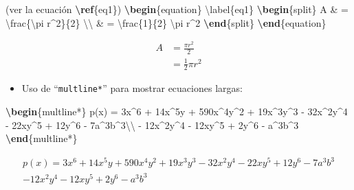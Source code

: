 \documentclass[12pt,a4paper,oneside,]{book}
\newenvironment{Shaded}{\begin{snugshade}}{\end{snugshade}}
\newcommand{\ExtensionTok}[1]{#1}
\newcommand{\KeywordTok}[1]{\textcolor[rgb]{0.13,0.29,0.53}{\textbf{#1}}}
\newcommand{\NormalTok}[1]{#1}
\newcommand{\SpecialCharTok}[1]{\textcolor[rgb]{0.00,0.00,0.00}{#1}}
\newcommand{\SpecialStringTok}[1]{\textcolor[rgb]{0.31,0.60,0.02}{#1}}
\providecommand{\tightlist}{%
  \setlength{\itemsep}{0pt}\setlength{\parskip}{0pt}}
\numberwithin{dummy}{section}
\theoremstyle{ocrenumbox}
\theoremstyle{blacknumex}
\theoremstyle{blacknumbox}
\theoremstyle{ocrenum}
\theoremstyle{ocrenum}
\begin{document}
\begin{Shaded}
\begin{Highlighting}[]
\NormalTok{(ver la ecuación }\KeywordTok{\textbackslash{}ref}\NormalTok{\{}\ExtensionTok{eq1}\NormalTok{\})}
\KeywordTok{\textbackslash{}begin}\NormalTok{\{}\ExtensionTok{equation}\NormalTok{\}}\SpecialStringTok{ }\SpecialCharTok{\textbackslash{}label}\SpecialStringTok{\{eq1\}}
\KeywordTok{\textbackslash{}begin}\NormalTok{\{}\ExtensionTok{split}\NormalTok{\}}
\SpecialStringTok{A \& = }\SpecialCharTok{\textbackslash{}frac}\SpecialStringTok{\{}\SpecialCharTok{\textbackslash{}pi}\SpecialStringTok{ r\^{}2\}\{2\} }\SpecialCharTok{\textbackslash{}\textbackslash{}}
\SpecialStringTok{ \& = }\SpecialCharTok{\textbackslash{}frac}\SpecialStringTok{\{1\}\{2\} }\SpecialCharTok{\textbackslash{}pi}\SpecialStringTok{ r\^{}2}
\KeywordTok{\textbackslash{}end}\NormalTok{\{}\ExtensionTok{split}\NormalTok{\}}
\KeywordTok{\textbackslash{}end}\NormalTok{\{}\ExtensionTok{equation}\NormalTok{\}}
\end{Highlighting}
\end{Shaded}

\begin{equation} \label{eq1}
\begin{split}
A & = \frac{\pi r^2}{2} \\
 & = \frac{1}{2} \pi r^2
\end{split}
\end{equation}

\begin{itemize}
\tightlist
\item
  Uso de ``\texttt{multline*}'' para mostrar ecuaciones largas:
\end{itemize}

\begin{Shaded}
\begin{Highlighting}[]
\KeywordTok{\textbackslash{}begin}\NormalTok{\{}\ExtensionTok{multline*}\NormalTok{\}}
\SpecialStringTok{p(x) = 3x\^{}6 + 14x\^{}5y + 590x\^{}4y\^{}2 + 19x\^{}3y\^{}3 }
\SpecialStringTok{            {-} 32x\^{}2y\^{}4 {-} 22xy\^{}5 + 12y\^{}6 {-} 7a\^{}3b\^{}3}\SpecialCharTok{\textbackslash{}\textbackslash{}}\SpecialStringTok{ }
\SpecialStringTok{{-} 12x\^{}2y\^{}4 {-} 12xy\^{}5 + 2y\^{}6 {-} a\^{}3b\^{}3}
\KeywordTok{\textbackslash{}end}\NormalTok{\{}\ExtensionTok{multline*}\NormalTok{\}}
\end{Highlighting}
\end{Shaded}

\begin{multline*}
p(x) = 3x^6 + 14x^5y + 590x^4y^2 + 19x^3y^3 
            - 32x^2y^4 - 22xy^5 + 12y^6 - 7a^3b^3 \\ 
- 12x^2y^4 - 12xy^5 + 2y^6 - a^3b^3
\end{multline*}
\end{document}
